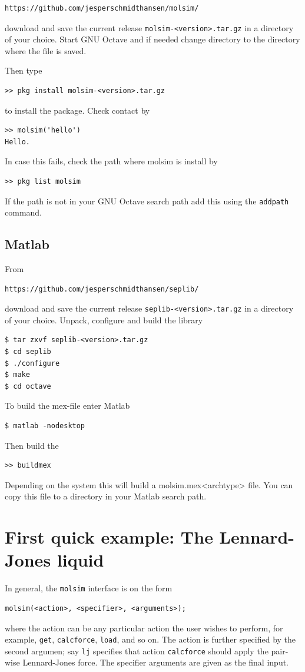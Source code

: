 \documentclass[11pt]{article}
\begin{document}
\begin{verbatim}
https://github.com/jesperschmidthansen/molsim/
\end{verbatim}

\noindent download and save the current release
\verb!molsim-<version>.tar.gz! in a directory of your choice. Start GNU
Octave and if needed change directory to the directory where the file is saved.

\noindent Then type
\begin{verbatim}
>> pkg install molsim-<version>.tar.gz 
\end{verbatim}
to install the package. Check contact by
\begin{verbatim}
>> molsim('hello')
Hello. 
\end{verbatim}
In case this fails, check the path where \textsf{molsim} is install by
\begin{verbatim}
>> pkg list molsim
\end{verbatim}
If the path is not in your GNU Octave search path add this using the
\verb!addpath! command.

\subsection{Matlab}
From
\begin{verbatim}
https://github.com/jesperschmidthansen/seplib/
\end{verbatim}
\noindent download and save the current release \verb!seplib-<version>.tar.gz!
in a directory of your choice. Unpack, configure and build the library
\begin{verbatim}
$ tar zxvf seplib-<version>.tar.gz
$ cd seplib
$ ./configure
$ make
$ cd octave
\end{verbatim}
To build the \textsf{mex}-file enter Matlab
\begin{verbatim}
$ matlab -nodesktop
\end{verbatim}
Then build the 
\begin{verbatim}
>> buildmex
\end{verbatim}
Depending on the system this will build a \textsf{molsim.mex<archtype>}
file. You can copy this file to a directory in your Matlab search path.

\section{First quick example: The Lennard-Jones liquid}
In general, the \verb!molsim! interface is on the form
\begin{verbatim}
molsim(<action>, <specifier>, <arguments>);
\end{verbatim}
where the action can be any particular action the user wishes to perform, for
example, \verb!get!, \verb!calcforce!, \verb!load!, and so on. The action is
further specified by the second argumen; say \verb!lj! specifies that action
\verb!calcforce! should apply the pair-wise Lennard-Jones force. The specifier
arguments are given as the final input.
\end{document}
